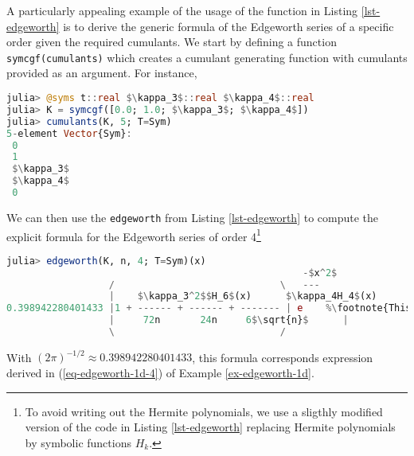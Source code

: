 A particularly appealing example of the usage of the function in Listing \ref{lst-edgeworth} is to derive the generic formula of the Edgeworth series of a specific order given the required cumulants. We start by defining a function \lstinline{symcgf(cumulants)} which creates a cumulant generating function with cumulants provided as an argument. For instance,
\begin{lstlisting}[language=Julia, mathescape, escapechar=\%]
julia> @syms t::real $\kappa_3$::real $\kappa_4$::real
julia> K = symcgf([0.0; 1.0; $\kappa_3$; $\kappa_4$])
julia> cumulants(K, 5; T=Sym)
5-element Vector{Sym}:
 0
 1
 $\kappa_3$
 $\kappa_4$
 0
\end{lstlisting}
We can then use the \lstinline{edgeworth} from Listing \ref{lst-edgeworth} to compute the explicit formula for the Edgeworth series of order 4\footnote{To avoid writing out the Hermite polynomials, we use a sligthly modified version of the code in Listing \ref{lst-edgeworth} replacing Hermite polynomials by symbolic functions $H_k$.}
\begin{lstlisting}[language=Julia, mathescape, escapechar=\%]
julia> edgeworth(K, n, 4; T=Sym)(x)
                                                    -$x^2$  
                  /                             \   ---
                  |    $\kappa_3^2$$H_6$(x)      $\kappa_4H_4$(x)      $\kappa_3H_3$(x)     |   2  
0.398942280401433 |1 + ------ + ------ + ------- | e    %\footnote{This output was lightly adapted to properly render in LaTeX. }%
                  |     72n       24n     6$\sqrt{n}$      |      
                  \                             /    

\end{lstlisting}
With $(2\pi)^{-1/2} \approx 0.398942280401433$, this formula corresponds expression derived in (\ref{eq-edgeworth-1d-4}) of Example \ref{ex-edgeworth-1d}.

